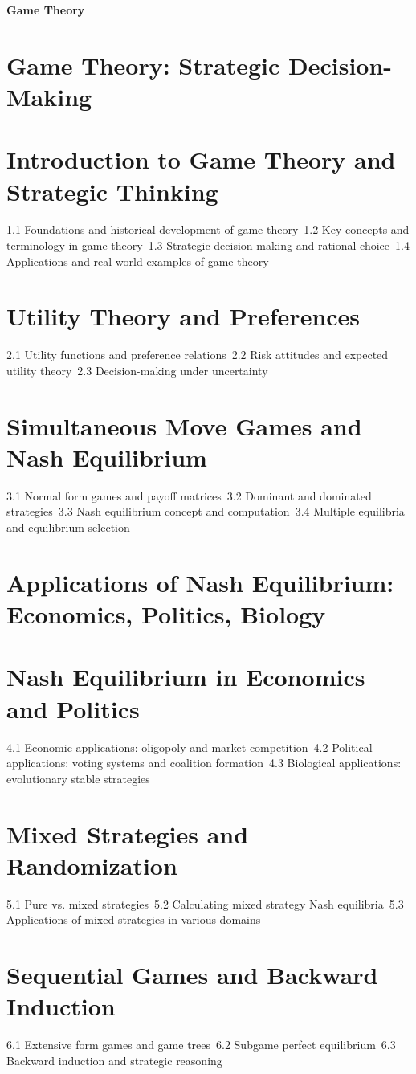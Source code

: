 {\LARGE \bf{Game Theory}}
\section{Game Theory: Strategic Decision-Making}
\section{Introduction to Game Theory and Strategic Thinking}
1.1 Foundations and historical development of game theory\
1.2 Key concepts and terminology in game theory\
1.3 Strategic decision-making and rational choice\
1.4 Applications and real-world examples of game theory\
\section{Utility Theory and Preferences}
2.1 Utility functions and preference relations\
2.2 Risk attitudes and expected utility theory\
2.3 Decision-making under uncertainty\
\section{Simultaneous Move Games and Nash Equilibrium}
3.1 Normal form games and payoff matrices\
3.2 Dominant and dominated strategies\
3.3 Nash equilibrium concept and computation\
3.4 Multiple equilibria and equilibrium selection\
\section{Applications of Nash Equilibrium: Economics, Politics, Biology}
\section{Nash Equilibrium in Economics and Politics}
4.1 Economic applications: oligopoly and market competition\
4.2 Political applications: voting systems and coalition formation\
4.3 Biological applications: evolutionary stable strategies\
\section{Mixed Strategies and Randomization}
5.1 Pure vs. mixed strategies\
5.2 Calculating mixed strategy Nash equilibria\
5.3 Applications of mixed strategies in various domains\
\section{Sequential Games and Backward Induction}
6.1 Extensive form games and game trees\
6.2 Subgame perfect equilibrium\
6.3 Backward induction and strategic reasoning\
